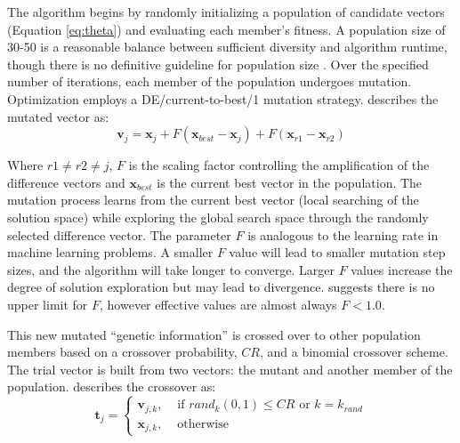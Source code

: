 The algorithm begins by randomly initializing a population of candidate vectors (Equation \ref{eq:theta}) and evaluating each member's fitness. A population size of 30-50 is a reasonable balance between sufficient diversity and algorithm runtime, though there is no definitive guideline for population size \citep{piotrowski2017review}. Over the specified number of iterations, each member of the population undergoes mutation. Optimization employs a DE/current-to-best/1 mutation strategy. \cite{georgioudakis2020comparative} describes the mutated vector as:
\begin{equation}
    \mathbf{v}_{j} = \mathbf{x}_{j} + F(\mathbf{x}_{best}-\mathbf{x}_{j}) + F(\mathbf{x}_{r1} - \mathbf{x}_{r2})
    \label{eq:mutation}
\end{equation}

Where $r1 \neq r2 \neq j$, $F$ is the scaling factor controlling the amplification of the difference vectors and $\mathbf{x}_{best}$ is the current best vector in the population. The mutation process learns from the current best vector (local searching of the solution space) while exploring the global search space through the randomly selected difference vector. The parameter $F$ is analogous to the learning rate in machine learning problems. A smaller $F$ value will lead to smaller mutation step sizes, and the algorithm will take longer to converge. Larger $F$ values increase the degree of solution exploration but may lead to divergence. \cite{price2013differential} suggests there is no upper limit for $F$, however effective values are almost always $F < 1.0$.

This new mutated ``genetic information'' is crossed over to other population members based on a crossover probability, $CR$, and a binomial crossover scheme. The trial vector is built from two vectors: the mutant and another member of the population. \cite{price2013differential} describes the crossover as:
\begin{equation}
    \mathbf{t}_{j} =
    \begin{cases}
        \mathbf{v}_{j, k}, & \text{ if }rand_{k}(0,1) \leq CR \text{ or } k=k_{rand} \\
        \mathbf{x}_{j, k}, & \text{ otherwise }
    \end{cases}
    \label{eq:crossover}
\end{equation}

